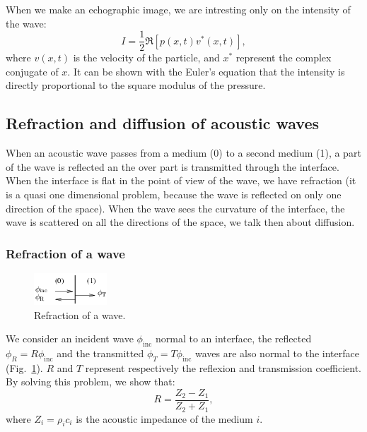 \documentclass[a4paper,twoside,11pt]{article}
\DeclareMathOperator{\inc}{inc}
\begin{document}
When we make an echographic image, we are intresting only on the intensity of 
the wave:
\begin{equation}
 I=\dfrac{1}{2}\Re\left[p\left(x,t\right)v^{*}\left(x,t\right)\right],
 \label{eq:acoustic intensity}
\end{equation}
where $v\left(x,t\right)$ is the velocity of the particle, and $x^{*}$ 
represent 
the complex conjugate of $x$. It can be shown with the Euler's equation that 
the 
intensity is directly proportional to the square modulus of the pressure.

\subsection{Refraction and diffusion of acoustic waves}
\label{sec:Refraction and diffusion of acoustic waves}

When an acoustic wave passes from a medium (0) to a second medium (1), a part 
of 
the wave is reflected an the over part is transmitted through the interface. 
When the interface is flat in the point of view of the wave, we have refraction 
(it is a quasi one dimensional problem, because the wave is reflected on 
only one direction of the space). When the wave sees the curvature of the 
interface, the wave is scattered on all the directions of the space, we talk 
then about diffusion.

\subsubsection{Refraction of a wave}
\label{sec:Refraction of a wave}

\begin{figure}[htb]
	\centering
		\includegraphics{image/refraction}
	\caption{Refraction of a wave.}
	\label{fig:refraction}
\end{figure}

We consider an incident wave $\phi_{\inc}$ normal to an interface, the reflected 
$\phi_{R}=R\phi_{\inc}$ and the transmitted $\phi_{T}=T\phi_{\inc}$ waves are 
also normal to the interface (Fig.~\ref{fig:refraction}). $R$ and $T$ represent 
respectively the reflexion and transmission coefficient. By solving this 
problem, we show that:
\begin{equation}
 R=\dfrac{Z_2-Z_1}{Z_2+Z_1},
 \label{eq:reflection coefficient}
\end{equation}
where $Z_i=\rho_ic_i$ is the acoustic impedance of the medium $i$.
\end{document}
